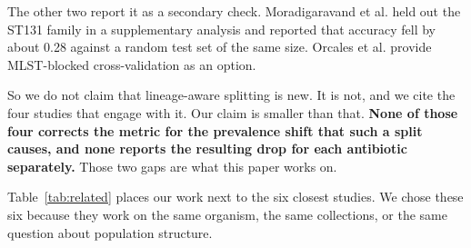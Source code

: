 \documentclass[conference]{IEEEtran}
\begin{document}
The other two report it as a secondary check. Moradigaravand et al.
\cite{moradigaravand2018} held out the ST131 family in a supplementary analysis and
reported that accuracy fell by about 0.28 against a random test set of the same
size. Orcales et al. \cite{orcales2024} provide MLST-blocked cross-validation as an
option.

So we do not claim that lineage-aware splitting is new. It is not, and we cite the
four studies that engage with it. Our claim is smaller than that. \textbf{None of
those four corrects the metric for the prevalence shift that such a split causes,
and none reports the resulting drop for each antibiotic separately.} Those two gaps
are what this paper works on.

Table~\ref{tab:related} places our work next to the six closest studies. We chose
these six because they work on the same organism, the same collections, or the
same question about population structure.
\end{document}
